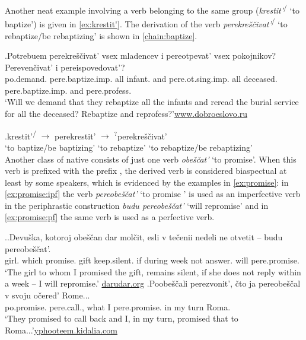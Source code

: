 Another neat example involving a verb belonging to the same group (\textit{krestit'}\textsuperscript{\IPF\slash\PF} `to baptize') is given in \ref{ex:krestit'}. The derivation of the verb \textit{perekre\v{s}\v{c}ivat'}\textsuperscript{\IPF\slash\PF} `to rebaptize/be rebaptizing' is shown in \ref{chain:baptize}.

\exg.\label{ex:krestit'}Potrebuem perekre\v{s}\v{c}ivat' vsex mladencev i pereotpevat' vsex pokojnikov? Pereven\v{c}ivat' i pereispovedovat'?\\
po.demand. pere.baptize.imp. all infant. and pere.ot.sing.imp. all deceased. pere.baptize.imp. and pere.profess.\\
\trans `Will we demand that they rebaptize all the infants and reread the burial service for all the deceased? Rebaptize and reprofess?'\hbox{}\hfill\hbox{\url{www.dobroeslovo.ru}}


\exg.\label{chain:baptize}krestit'\textsuperscript{\IPF\slash\PF} $\rightarrow$ perekrestit'\textsuperscript{\PF} $\rightarrow$ $^?$perekre\v{s}\v{c}ivat'\textsuperscript{\IPF}\\
{`to baptize/be baptizing'} {} {`to rebaptize'} {} {`to rebaptize/be rebaptizing'}\\

Another class of native  consists of just one verb \textit{obe\v{s}\v{c}at'} `to promise'. When this verb is prefixed with the  prefix , the derived verb is considered biaspectual at least by some speakers, which is evidenced by the examples in \ref{ex:promise}: in \ref{ex:promise:ipf} the verb \textit{pereobe\v{s}\v{c}at'} `to promise ' is used as an imperfective verb in the periphrastic  construction \textit{budu pereobe\v{s}\v{c}at'} `will repromise' and in \ref{ex:promise:pf} the same verb is used as a perfective verb. 

\ex.\label{ex:promise}\ag.\label{ex:promise:ipf}Devu\v{s}ka, kotoroj obe\v{s}\v{c}an dar mol\v{c}it, esli {v te\v{c}enii} nedeli ne otvetit -- budu pereobe\v{s}\v{c}at'.\\
girl. which promise. gift keep.silent. if during week not answer. {}  will pere.promise.\\
\trans `The girl to whom I promised the gift, remains silent, if she does not reply within a week -- I will repromise.'
\hbox{}\hfill\hbox{\url{darudar.org}}
\bg.\label{ex:promise:pf}Poobe\v{s}\v{c}ali perezvonit', \v{c}to ja pereobe\v{s}\v{c}al v svoju o\v{c}ered' Rome...\\
po.promise. pere.call., what I pere.promise. in my turn Roma.\\
\trans `They promised to call back and I, in my turn, promised that to Roma...'\hbox{}\hfill\hbox{\url{yphooteem.kidalia.com}}

